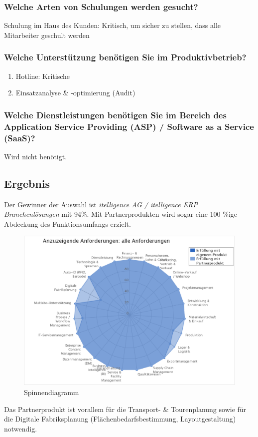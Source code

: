\subsubsection{Welche Arten von Schulungen werden gesucht?}
Schulung im Haus des Kunden: Kritisch, um sicher zu stellen, dass alle Mitarbeiter geschult werden

\subsubsection{Welche Unterstützung benötigen Sie im Produktivbetrieb?}
\begin{enumerate}
	\item Hotline: Kritische
	\item Einsatzanalyse \& -optimierung (Audit)
\end{enumerate}

\subsubsection{Welche Dienstleistungen benötigen Sie im Bereich des Application Service Providing (ASP) / Software as a Service (SaaS)?}
Wird nicht benötigt.
\newpage
\subsection{Ergebnis}
Der Gewinner der Auswahl ist \textit{itelligence AG / itelligence ERP Branchenlösungen} mit 94\%. Mit Partnerprodukten wird sogar eine 100 \%ige Abdeckung des Funktionsumfangs erzielt. 

\begin{figure}[H]
\begin{center}
\includegraphics[width=15cm]{images/chart.png}
\caption{Spinnendiagramm}
\end{center}
\end{figure}
\noindent
Das Partnerprodukt ist vorallem für die Transport- \& Tourenplanung sowie für die Digitale Fabriksplanung (Flächenbedarfsbestimmung, Layoutgestaltung) notwendig.